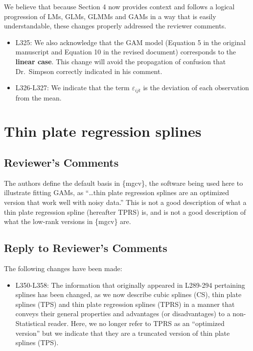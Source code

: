 \documentclass[
]{article}
\providecommand{\tightlist}{%
  \setlength{\itemsep}{0pt}\setlength{\parskip}{0pt}}
\begin{document}
We believe that because Section 4 now provides context and follows a logical progression of LMs, GLMs, GLMMs and GAMs in a way that is easily understandable, these changes properly addressed the reviewer comments.

\begin{itemize}
\item
  L325: We also acknowledge that the GAM model (Equation 5 in the original manuscript and Equation 10 in the revised document) corresponds to the \textbf{linear case}. This change will avoid the propagation of confusion that Dr.~Simpson correctly indicated in his comment.
\item
  L326-L327: We indicate that the term \(\varepsilon_{ijt}\) is the deviation of each observation from the mean.
\end{itemize}

\hypertarget{thin-plate-regression-splines}{%
\section{Thin plate regression splines}\label{thin-plate-regression-splines}}

\hypertarget{reviewers-comments-3}{%
\subsection{Reviewer's Comments}\label{reviewers-comments-3}}

The authors define the default basis in \{mgcv\}, the software being used here to illustrate fitting GAMs, as ``\ldots thin plate regression splines are an optimized version that work well with noisy data.'' This is not a good description of what a thin plate regression spline (hereafter TPRS) is, and is not a good description of what the low-rank versions in \{mgcv\} are.

\hypertarget{section-4}{%
\subsection{\texorpdfstring{\textcolor{reviewersblue} {Reply to Reviewer's Comments}}{}}\label{section-4}}

The following changes have been made:

\begin{itemize}
\tightlist
\item
  L350-L358: The information that originally appeared in L289-294 pertaining splines has been changed, as we now describe cubic splines (CS), thin plate splines (TPS) and thin plate regression splines (TPRS) in a manner that conveys their general properties and advantages (or disadvantages) to a non-Statistical reader. Here, we no longer refer to TPRS as an ``optimized version'' but we indicate that they are a truncated version of thin plate splines (TPS).
\end{itemize}
\end{document}
